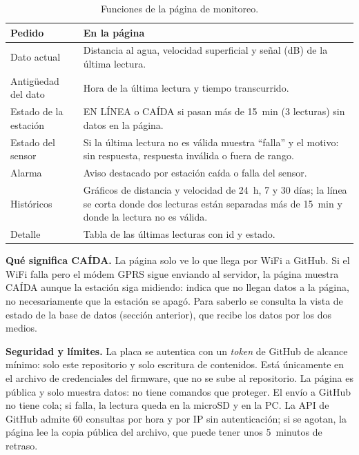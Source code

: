 \documentclass[11pt,a4paper]{article}
\begin{document}
\begin{table}[H]
    \centering
    \small
    \caption{Funciones de la página de monitoreo.}
    \begin{tabularx}{\textwidth}{>{\raggedright\arraybackslash}p{3.6cm}L}
        \toprule
        \textbf{Pedido} & \textbf{En la página} \\
        \midrule
        Dato actual & Distancia al agua, velocidad superficial y señal (dB) de
            la última lectura. \\
        Antigüedad del dato & Hora de la última lectura y tiempo transcurrido. \\
        Estado de la estación & EN LÍNEA o CAÍDA si pasan
            más de 15~min (3 lecturas) sin datos en la página. \\
        Estado del sensor & Si la última lectura no es válida muestra
            ``falla'' y el motivo: sin respuesta, respuesta inválida o fuera
            de rango. \\
        Alarma & Aviso destacado por estación caída o falla del sensor. \\
        Históricos & Gráficos de distancia y velocidad de 24~h, 7 y 30 días;
            la línea se corta donde dos lecturas están separadas más de
            15~min y donde la lectura no es válida. \\
        Detalle & Tabla de las últimas lecturas con id y estado. \\
        \bottomrule
    \end{tabularx}
\end{table}

\textbf{Qué significa CAÍDA.} La página solo ve lo que llega por WiFi a GitHub.
Si el WiFi falla pero el módem GPRS sigue enviando al servidor, la página
muestra CAÍDA aunque la estación siga midiendo: indica que no llegan datos a la
página, no necesariamente que la estación se apagó. Para saberlo se consulta la
vista de estado de la base de datos (sección anterior), que recibe los datos
por los dos medios.

\textbf{Seguridad y límites.} La placa se autentica con un \emph{token} de
GitHub de alcance mínimo: solo este repositorio y solo escritura de contenidos.
Está únicamente en el archivo de credenciales del firmware, que no se sube al
repositorio. La página es pública y solo muestra datos: no tiene comandos que
proteger. El envío a GitHub no tiene cola; si falla, la lectura queda en la
microSD y en la PC. La API de GitHub admite 60 consultas por hora y por IP sin
autenticación; si se agotan, la página lee la copia pública del archivo, que
puede tener unos 5~minutos de retraso.
\end{document}
